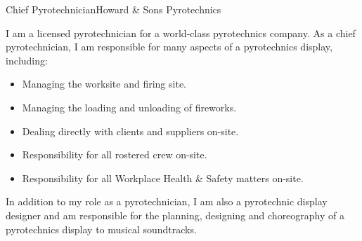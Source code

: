 \begin{professionalExperience}
{    %
}

{Chief Pyrotechnician}{Howard \& Sons Pyrotechnics}
{I am a licensed pyrotechnician for a world-class pyrotechnics company. As a
chief pyrotechnician, I am responsible for many aspects of a pyrotechnics
display, including:
\begin{itemize}
    \item Managing the worksite and firing site.
    \item Managing the loading and unloading of fireworks.
    \item Dealing directly with clients and suppliers on-site.
    \item Responsibility for all rostered crew on-site.
    \item Responsibility for all Workplace Health \& Safety matters on-site.
\end{itemize}

In addition to my role as a pyrotechnician, I am also a pyrotechnic display
designer and am responsible for the planning, designing and choreography of a
pyrotechnics display to musical soundtracks.}
{}

\end{professionalExperience}
